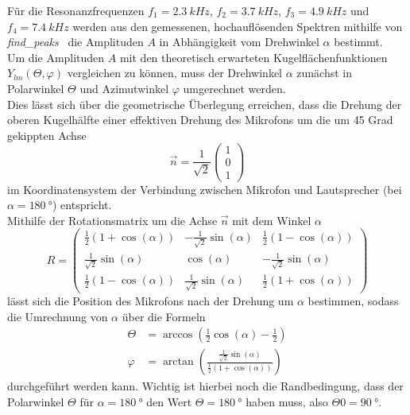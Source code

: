 Für die Resonanzfrequenzen $f_1 = \qty{2.3}{kHz}$, $f_2 = \qty{3.7}{kHz}$, $f_3 = \qty{4.9}{kHz}$ und $f_4 = \qty{7.4}{kHz}$ werden aus den gemessenen, hochauflösenden Spektren mithilfe von \textit{find\_peaks}~\cite{scipy} die Amplituden $A$ in Abhängigkeit vom Drehwinkel $\alpha$ bestimmt. \\ 

Um die Amplituden $A$ mit den theoretisch erwarteten Kugelflächenfunktionen $Y_{lm}(\Theta, \varphi)$ vergleichen zu können, muss der Drehwinkel $\alpha$ zunächst in Polarwinkel $\Theta$ und Azimutwinkel $\varphi$ umgerechnet werden. \\
Dies lässt sich über die geometrische Überlegung erreichen, dass die Drehung der oberen Kugelhälfte einer effektiven Drehung des Mikrofons um die um 45 Grad gekippten Achse 
\begin{equation*}
    \vec{n} = \frac{1}{\sqrt{2}} \begin{pmatrix} 1 \\ 0 \\ 1 \end{pmatrix}
\end{equation*}
im Koordinatensystem der Verbindung zwischen Mikrofon und Lautsprecher (bei $\alpha = \qty{180}{\degree}$) entspricht. \\
Mithilfe der Rotationsmatrix um die Achse $\vec{n}$ mit dem Winkel $\alpha$
\begin{equation*}
    R = \begin{pmatrix} \frac{1}{2} \left(1 + \cos(\alpha)\right) & -\frac{1}{\sqrt{2}} \sin(\alpha) & \frac{1}{2} \left(1 - \cos(\alpha)\right) \\ \frac{1}{\sqrt{2}} \sin(\alpha) & \cos(\alpha) & -\frac{1}{\sqrt{2}} \sin(\alpha) \\ \frac{1}{2} \left(1 - \cos(\alpha)\right) & \frac{1}{\sqrt{2}} \sin(\alpha) & \frac{1}{2} \left(1 + \cos(\alpha)\right) \end{pmatrix}
\end{equation*}
lässt sich die Position des Mikrofons nach der Drehung um $\alpha$ bestimmen, sodass die Umrechnung von $\alpha$ über die Formeln
\begin{align*}
    \Theta &= \arccos\left(\frac{1}{2} \cos(\alpha) - \frac{1}{2}\right) \\
    \varphi &= \arctan\left(\frac{\frac{1}{\sqrt{2}} \sin(\alpha)}{\frac{1}{2} \left(1 + \cos(\alpha)\right)}\right)
\end{align*}
durchgeführt werden kann. Wichtig ist hierbei noch die Randbedingung, dass der Polarwinkel $\Theta$ für $\alpha = \qty{180}{\degree}$ den Wert $\Theta = \qty{180}{\degree}$ haben muss, also $\Theta{0} = \qty{90}{\degree}$. \\

